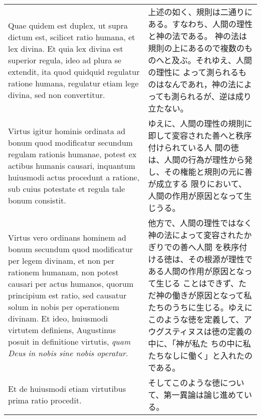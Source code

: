 \documentclass[10pt]{jsarticle}
\begin{document}
\begin{longtable}{p{21em}p{21em}}
 
\\

 Quae quidem est duplex, ut supra dictum est, scilicet ratio humana,
et lex divina. Et quia lex divina est superior regula, ideo ad plura
se extendit, ita quod quidquid regulatur ratione humana, regulatur
etiam lege divina, sed non convertitur.

&

 上述の如く、規則は二通りにある。すなわち、人間の理性と神の法である。
 神の法は規則の上にあるので複数のものへと及ぶ。それゆえ、人間の理性に
 よって測られるものはなんであれ，神の法によっても測られるが、逆は成り
 立たない。

 
\\

 Virtus igitur hominis ordinata ad bonum quod modificatur secundum
regulam rationis humanae, potest ex actibus humanis causari, inquantum
huiusmodi actus procedunt a ratione, sub cuius potestate et regula
tale bonum consistit.

&

 ゆえに、人間の理性の規則に即して変容された善へと秩序付けられている人
 間の徳は、人間の行為が理性から発し、その権能と規則の元に善が成立する
 限りにおいて、人間の作用が原因となって生じうる。

 
\\


 Virtus vero ordinans hominem ad bonum secundum quod modificatur per
legem divinam, et non per rationem humanam, non potest causari per
actus humanos, quorum principium est ratio, sed causatur solum in
nobis per operationem divinam. Et ideo, huiusmodi virtutem definiens,
Augustinus posuit in definitione virtutis, {\itshape quam Deus in
nobis sine nobis operatur}.


&

 他方で、人間の理性ではなく神の法によって変容されたかぎりでの善へ人間
 を秩序付ける徳は、その根源が理性である人間の作用が原因となって生じる
 ことはできず、ただ神の働きが原因となって私たちのうちに生じる。ゆえに
 このような徳を定義して、アウグスティヌスは徳の定義の中に、「神が私た
 ちの中に私たちなしに働く」と入れたのである。
 
 
\\


Et de huiusmodi etiam virtutibus prima ratio procedit.

&

そしてこのような徳について、第一異論は論じ進めている。
 
\\


\end{longtable}
\end{document}
